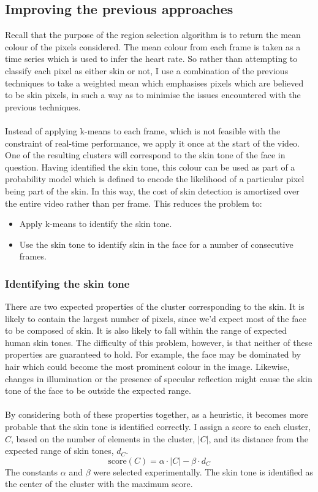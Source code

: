 \subsection{Improving the previous approaches}
Recall that the purpose of the region selection algorithm is to return the mean colour of the pixels considered. The mean colour from each frame is taken as a time series which is used to infer the heart rate. So rather than attempting to classify each pixel as either skin or not, I use a combination of the previous techniques to take a weighted mean which emphasises pixels which are believed to be skin pixels, in such a way as to minimise the issues encountered with the previous techniques.
\\ \\
Instead of applying k-means to each frame, which is not feasible with the constraint of real-time performance, we apply it once at the start of the video.
One of the resulting clusters will correspond to the skin tone of the face in question.
Having identified the skin tone, this colour can be used as part of a probability model which is defined to encode the likelihood of a particular pixel being part of the skin. 
In this way, the cost of skin detection is amortized over the entire video rather than per frame.
This reduces the problem to: 
\begin{itemize}
   \item Apply k-means to identify the skin tone.
   \item Use the skin tone to identify skin in the face for a number of consecutive frames.
\end{itemize}
\subsubsection{Identifying the skin tone}
There are two expected properties of the cluster corresponding to the skin. It is likely to contain the largest number of pixels, since we'd expect most of the face to be composed of skin. It is also likely to fall within the range of expected human skin tones.
The difficulty of this problem, however, is that neither of these properties are guaranteed to hold.
For example, the face may be dominated by hair which could become the most prominent colour in the image. Likewise, changes in illumination or the presence of specular reflection might cause the skin tone of the face to be outside the expected range.
\\ \\
By considering both of these properties together, as a heuristic, it becomes more probable that the skin tone is identified correctly. I assign a score to each cluster, $C$, based on the number of elements in the cluster, $|C|$, and its distance from the expected range of skin tones, $d_C$.
\begin{equation*}
    \mathrm{score}(C) = \alpha\cdot |C| - \beta\cdot d_C
\end{equation*}
The constants $\alpha$ and $\beta$ were selected experimentally. The skin tone is identified as the center of the cluster with the maximum score.

